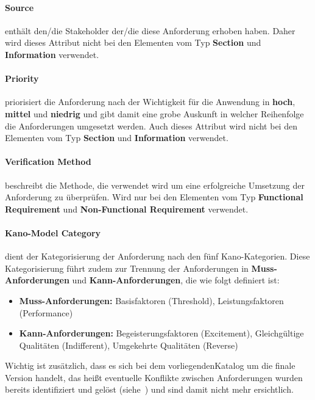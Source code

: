 \paragraph{Source} enthält den/die Stakeholder der/die diese Anforderung erhoben haben.
Daher wird dieses Attribut nicht bei den Elementen vom Typ \textbf{Section} und \textbf{Information} verwendet.

\paragraph{Priority} priorisiert die Anforderung nach der Wichtigkeit für die Anwendung in \textbf{hoch}, \textbf{mittel}
und \textbf{niedrig} und gibt damit eine grobe Auskunft in welcher Reihenfolge die Anforderungen umgesetzt werden.
Auch dieses Attribut wird nicht bei den Elementen vom Typ \textbf{Section} und \textbf{Information} verwendet.

\paragraph{Verification Method} beschreibt die Methode, die verwendet wird um eine erfolgreiche Umsetzung der Anforderung
zu überprüfen.
Wird nur bei den Elementen vom Typ \textbf{Functional Requirement} und \textbf{Non-Functional Requirement} verwendet.

\paragraph{Kano-Model Category} dient der Kategorisierung der Anforderung nach den fünf Kano-Kategorien.
Diese Kategorisierung führt zudem zur Trennung der Anforderungen in \textbf{Muss-Anforderungen} und \textbf{Kann-Anforderungen},
die wie folgt definiert ist:

\begin{itemize}
    \item \textbf{Muss-Anforderungen:} Basisfaktoren (Threshold), Leistungsfaktoren (Performance)
    \item \textbf{Kann-Anforderungen:} Begeisterungsfaktoren (Excitement), Gleichgültige Qualitäten (Indifferent),
    Umgekehrte Qualitäten (Reverse)
\end{itemize}

Wichtig ist zusätzlich, dass es sich bei dem vorliegendenKatalog um die finale Version handelt, das heißt eventuelle Konflikte
zwischen Anforderungen wurden bereits identifiziert und gelöst (siehe~) und sind damit nicht
mehr ersichtlich.

